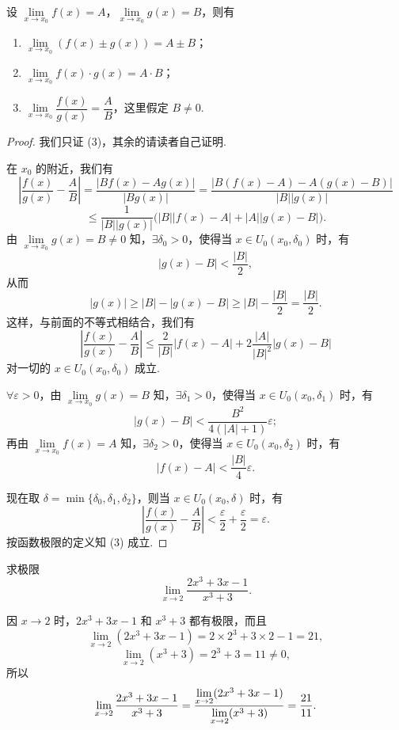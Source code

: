\begin{theorem}[{四则运算}]\label{theorem:ma-3-1-3}
设 $\lim\limits_{x\to x_0}f(x)=A$，$\lim\limits_{x\to x_0}g(x)=B$，则有
\begin{enumerate}
  \item $\lim\limits_{x\to x_0}(f(x)\pm g(x))=A\pm B$；
  \item $\lim\limits_{x\to x_0}f(x)\cdot g(x)=A\cdot B$；
  \item $\lim\limits_{x\to x_0}\dfrac{f(x)}{g(x)}=\dfrac{A}{B}$，这里假定 $B\ne0$.
\end{enumerate}
\end{theorem}


\begin{proof}
我们只证 (3)，其余的请读者自己证明.

在 $x_0$ 的附近，我们有
\[
  \left|\frac{f(x)}{g(x)}-\frac{A}{B}\right|
  =\frac{|Bf(x)-Ag(x)|}{|Bg(x)|}
  =\frac{|B(f(x)-A)-A(g(x)-B)|}{|B||g(x)|}
\]
\[
  \leqslant \frac{1}{|B||g(x)|}\bigl(|B||f(x)-A|+|A||g(x)-B|\bigr).
\]
由 $\lim\limits_{x\to x_0}g(x)=B\ne0$ 知，$\exists\delta_0>0$，使得当 $x\in U_0(x_0,\delta_0)$ 时，有
\[
  |g(x)-B|<\frac{|B|}{2},
\]
从而
\[
  |g(x)|\geqslant |B|-|g(x)-B|\geqslant |B|-\frac{|B|}{2}=\frac{|B|}{2}.
\]
这样，与前面的不等式相结合，我们有
\[
  \left|\frac{f(x)}{g(x)}-\frac{A}{B}\right|
  \leqslant \frac{2}{|B|}|f(x)-A|+2\frac{|A|}{|B|^2}|g(x)-B|
\]
对一切的 $x\in U_0(x_0,\delta_0)$ 成立.

$\forall\varepsilon>0$，由 $\lim\limits_{x\to x_0}g(x)=B$ 知，$\exists\delta_1>0$，使得当 $x\in U_0(x_0,\delta_1)$ 时，有
\[
  |g(x)-B|<\frac{B^2}{4(|A|+1)}\varepsilon;
\]
再由 $\lim\limits_{x\to x_0}f(x)=A$ 知，$\exists\delta_2>0$，使得当 $x\in U_0(x_0,\delta_2)$ 时，有
\[
  |f(x)-A|<\frac{|B|}{4}\varepsilon.
\]

现在取 $\delta=\min\{\delta_0,\delta_1,\delta_2\}$，则当 $x\in U_0(x_0,\delta)$ 时，有
\[
  \left|\frac{f(x)}{g(x)}-\frac{A}{B}\right|
  <\frac{\varepsilon}{2}+\frac{\varepsilon}{2}=\varepsilon.
\]
按函数极限的定义知 (3) 成立.
\end{proof}


\begin{example}\label{example:ma-3-1-4}
求极限
\[
  \lim_{x\to2}\frac{2x^3+3x-1}{x^3+3}.
\]
\end{example}


\begin{solve}
因 $x\to2$ 时，$2x^3+3x-1$ 和 $x^3+3$ 都有极限，而且
\[
  \lim_{x\to2}(2x^3+3x-1)=2\times2^3+3\times2-1=21,
\]
\[
  \lim_{x\to2}(x^3+3)=2^3+3=11\ne0,
\]
所以
\[
  \lim_{x\to2}\frac{2x^3+3x-1}{x^3+3}
  =\frac{\lim\limits_{x\to2}(2x^3+3x-1)}
  {\lim\limits_{x\to2}(x^3+3)}
  =\frac{21}{11}.
\qedhere
\]
\end{solve}


